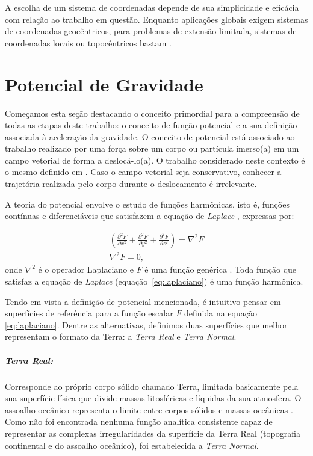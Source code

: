 A escolha de um sistema de coordenadas depende de sua simplicidade e eficácia com relação ao trabalho em questão. Enquanto aplicações globais exigem sistemas de coordenadas geocêntricos, para problemas de extensão limitada, sistemas de coordenadas locais ou topocêntricos bastam \cite{torge2001geodesy}.

\section{Potencial de Gravidade}
Começamos esta seção destacando o conceito primordial para a compreensão de todas as etapas deste trabalho: o conceito de função potencial e a sua definição associada à aceleração da gravidade. O conceito de potencial está associado ao trabalho realizado por uma força sobre um corpo ou partícula imerso(a) em um campo vetorial de forma a deslocá-lo(a). O trabalho considerado neste contexto é o mesmo definido em . Caso o campo vetorial seja conservativo, conhecer a trajetória realizada pelo corpo durante o deslocamento é irrelevante. 

A teoria do potencial envolve o estudo de funções harmônicas, isto é, funções contínuas e diferenciáveis que satisfazem a equação de \textit{Laplace} \cite{calculo_diferencial}, expressas por:

\begin{equation} \label{eq:laplaciano}
\begin{gathered}
\displaystyle {\left( \frac{\partial^{2} F}{\partial x^{2}}+\frac{\partial^{2} F}{\partial y^{2}}+\frac{\partial^{2} F}{\partial z^{2}}\right)  = \nabla^{2}F} \\	
\displaystyle {\nabla^{2}F  = 0},
\end{gathered}
\end{equation} onde $\nabla^{2}$ é o operador Laplaciano e $F$ é uma função genérica \cite{braun1983differential,jost2013edo,modelagem_matematica}. Toda função que satisfaz a equação de \textit{Laplace} (equação~\ref{eq:laplaciano}) é uma função harmônica.

Tendo em vista a definição de potencial mencionada, é intuitivo pensar em superfícies de referência para a função escalar $F$ definida na equação \ref{eq:laplaciano}. Dentre as alternativas, definimos duas superfícies que melhor representam o formato da Terra: a \textit{Terra Real} e \textit{Terra Normal}.
\subparagraph{\textit{Terra Real}:}Corresponde ao próprio corpo sólido chamado Terra, limitada basicamente pela sua superfície física que divide massas litosféricas e líquidas da sua atmosfera. O assoalho oceânico representa o limite entre corpos sólidos e massas oceânicas \cite{torge2001geodesy}. Como não foi encontrada nenhuma função analítica consistente capaz de representar as complexas irregularidades da superfície da Terra Real (topografia continental e do assoalho oceânico), foi estabelecida a \textit{Terra Normal}.%

